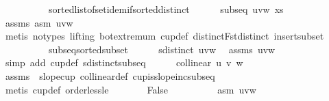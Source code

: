 \begin{isabellebody}
\ \ \ \ \ \ \ \ \ \ sorted{\isacharunderscore}{\kern0pt}list{\isacharunderscore}{\kern0pt}of{\isacharunderscore}{\kern0pt}set{\isachardot}{\kern0pt}idem{\isacharunderscore}{\kern0pt}if{\isacharunderscore}{\kern0pt}sorted{\isacharunderscore}{\kern0pt}distinct{\isacharparenright}{\kern0pt}\isanewline
\ \ \ \ \isamarkupfalse%
\ {}{\isacharcolon}{\kern0pt}{\isachardoublequoteopen}subseq\ {\isacharbrackleft}{\kern0pt}u{\isacharcomma}{\kern0pt}v{\isacharcomma}{\kern0pt}w{\isacharbrackright}{\kern0pt}\ xs{\isachardoublequoteclose}\ \isamarkupfalse%
\ assms\ asm\ uvw\isanewline
\ \ \ \ \ \ \isamarkupfalse%
\ {\isacharparenleft}{\kern0pt}metis\ {\isacharparenleft}{\kern0pt}no{\isacharunderscore}{\kern0pt}types{\isacharcomma}{\kern0pt}\ lifting{\isacharparenright}{\kern0pt}\ bot{\isachardot}{\kern0pt}extremum\ cup{\isacharunderscore}{\kern0pt}def\ distinctFst{\isacharunderscore}{\kern0pt}distinct\ insert{\isacharunderscore}{\kern0pt}subset\isanewline
\ \ \ \ \ \ \ \ \ \ subseq{\isacharunderscore}{\kern0pt}sorted{\isacharunderscore}{\kern0pt}subset{\isacharparenright}{\kern0pt}\isanewline
\ \ \ \ \isamarkupfalse%
\ {}{\isacharcolon}{\kern0pt}{\isachardoublequoteopen}sdistinct\ {\isacharbrackleft}{\kern0pt}u{\isacharcomma}{\kern0pt}v{\isacharcomma}{\kern0pt}w{\isacharbrackright}{\kern0pt}{\isachardoublequoteclose}\ \isamarkupfalse%
\ assms\ uvw\isanewline
\ \ \ \ \ \ \isamarkupfalse%
\ {\isacharparenleft}{\kern0pt}simp\ add{\isacharcolon}{\kern0pt}\ cup{\isacharunderscore}{\kern0pt}def\ sdistinct{\isacharunderscore}{\kern0pt}subseq{\isacharparenright}{\kern0pt}\isanewline
\ \ \ \ \isamarkupfalse%
\ {\isachardoublequoteopen}{\isasymnot}collinear{}\ u\ v\ w{\isachardoublequoteclose}\ \isamarkupfalse%
\ assms\ {}\ slope{\isacharunderscore}{\kern0pt}cup{}\ collinear{}{\isacharunderscore}{\kern0pt}def\ cup{\isacharunderscore}{\kern0pt}is{\isacharunderscore}{\kern0pt}slopeinc{\isacharunderscore}{\kern0pt}subseq\isanewline
\ \ \ \ \ \ \isamarkupfalse%
\ {\isacharparenleft}{\kern0pt}metis\ cup{}{\isacharunderscore}{\kern0pt}def\ order{\isacharunderscore}{\kern0pt}less{\isacharunderscore}{\kern0pt}le{\isacharparenright}{\kern0pt}\isanewline
\ \ \ \ \isamarkupfalse%
\ \isamarkupfalse%
\ False\ \isanewline
\ \ \ \ \ \ \isamarkupfalse%
\ {}\ asm{\isacharparenleft}{\kern0pt}{}{\isacharcomma}{\kern0pt}{}{\isacharparenright}{\kern0pt}\ uvw\isanewline

\end{isabellebody}
